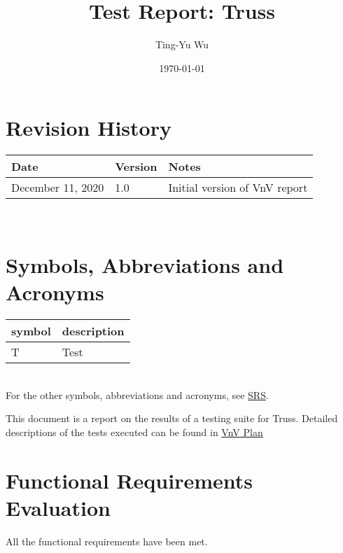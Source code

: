 \documentclass[12pt, titlepage]{article}
\begin{document}
\title{Test Report: Truss} 
\author{Ting-Yu Wu}
\date{\today}
	
\maketitle


\section{Revision History}

\begin{tabularx}{\textwidth}{p{3.5cm}p{2cm}X}
\toprule {\bf Date} & {\bf Version} & {\bf Notes}\\
\midrule
December 11, 2020 & 1.0 & Initial version of VnV report\\
\bottomrule
\end{tabularx}

~\newpage

\section{Symbols, Abbreviations and Acronyms}

\renewcommand{\arraystretch}{1.2}
\begin{tabular}{l l} 
  \toprule		
  \textbf{symbol} & \textbf{description}\\
  \midrule 
  T & Test\\
  \bottomrule
\end{tabular}\\

For the other symbols, abbreviations and acronyms, see 
\href{https://github.com/tingyuw/cas741/blob/master/docs/SRS/SRS.pdf}{SRS}.

\newpage

\tableofcontents

\listoftables %

\newpage


This document is a report on the results of a testing suite for Truss. Detailed 
descriptions of the tests executed can be found in 
\href{https://github.com/tingyuw/cas741/blob/master/docs/VnVPlan/VnVPlan.pdf}{VnV
 Plan}
\section{Functional Requirements Evaluation} \label{funcreq}
All the functional requirements have been met.
\end{document}
